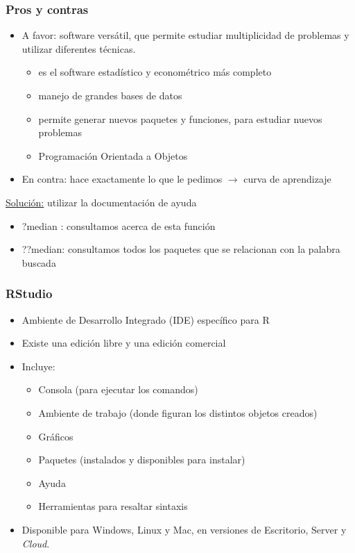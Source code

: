 \documentclass[11pt]{beamer}
\begin{document}
\begin{frame}
\frametitle{Pros y contras}
\begin{itemize}
	\item A favor: software versátil, que permite estudiar multiplicidad de problemas y utilizar diferentes técnicas.
	\begin{itemize}
		\item es el software estadístico y econométrico más completo
		\item manejo de grandes bases de datos
		\item permite generar nuevos paquetes y funciones, para estudiar nuevos problemas
		\item Programación Orientada a Objetos
	\end{itemize}
	\item En contra: hace exactamente lo que le pedimos $\rightarrow$ curva de aprendizaje
\end{itemize}
\underline{Solución:} utilizar la documentación de ayuda
\begin{itemize}
	\item ?median : consultamos acerca de esta función
	\item ??median: consultamos todos los paquetes que se relacionan con la palabra buscada
\end{itemize}
\end{frame}

\begin{frame}
\frametitle{RStudio}
\begin{itemize}
	\item Ambiente de Desarrollo Integrado (IDE) específico para R
	\item Existe una edición libre y una edición comercial
	\item Incluye:
	\begin{itemize}
		\item Consola (para ejecutar los comandos)
		\item Ambiente de trabajo (donde figuran los distintos objetos creados)
		\item Gráficos
		\item Paquetes (instalados y disponibles para instalar)
		\item Ayuda
		\item Herramientas para resaltar sintaxis
	\end{itemize}
	\item Disponible para Windows, Linux y Mac, en versiones de Escritorio, Server y \textit{Cloud}.
\end{itemize}
\end{frame}
\end{document}
